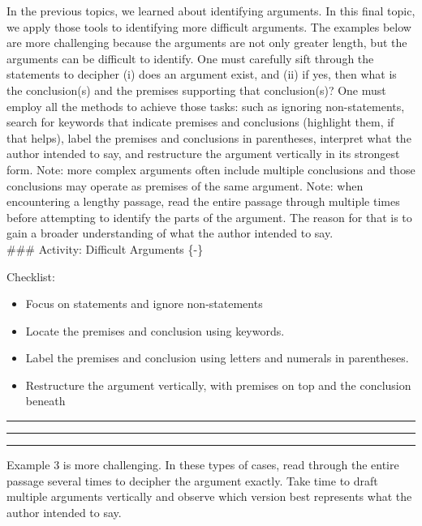 \documentclass[
]{book}
\providecommand{\tightlist}{%
  \setlength{\itemsep}{0pt}\setlength{\parskip}{0pt}}
\begin{document}
In the previous topics, we learned about identifying arguments. In this final topic, we apply those tools to identifying more difficult arguments. The examples below are more challenging because the arguments are not only greater length, but the arguments can be difficult to identify. One must carefully sift through the statements to decipher (i) does an argument exist, and (ii) if yes, then what is the conclusion(s) and the premises supporting that conclusion(s)? One must employ all the methods to achieve those tasks: such as ignoring non-statements, search for keywords that indicate premises and conclusions (highlight them, if that helps), label the premises and conclusions in parentheses, interpret what the author intended to say, and restructure the argument vertically in its strongest form. Note: more complex arguments often include multiple conclusions and those conclusions may operate as premises of the same argument. Note: when encountering a lengthy passage, read the entire passage through multiple times before attempting to identify the parts of the argument. The reason for that is to gain a broader understanding of what the author intended to say.\\
\#\#\# Activity: Difficult Arguments \{-\}

\begin{reflect}
{Checklist:}

\begin{itemize}
\tightlist
\item
  Focus on statements and ignore non-statements\\
\item
  Locate the premises and conclusion using keywords.\\
\item
  Label the premises and conclusion using letters and numerals in parentheses.\\
\item
  Restructure the argument vertically, with premises on top and the conclusion beneath
\end{itemize}

\begin{center}\rule{0.5\linewidth}{0.5pt}\end{center}

\begin{center}\rule{0.5\linewidth}{0.5pt}\end{center}

\begin{center}\rule{0.5\linewidth}{0.5pt}\end{center}

Example 3 is more challenging. In these types of cases, read through the entire passage several times to decipher the argument exactly. Take time to draft multiple arguments vertically and observe which version best represents what the author intended to say.
\end{reflect}
\end{document}
